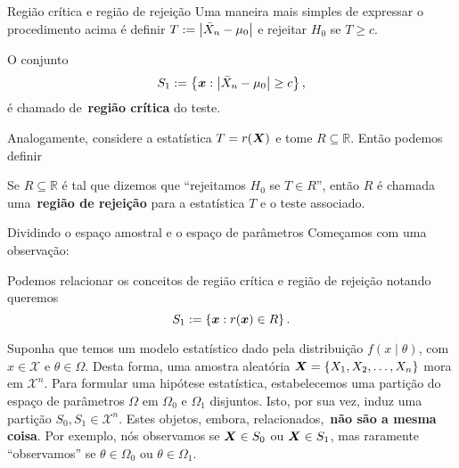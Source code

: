 \begin{frame}{Região crítica e região de rejeição}
 Uma maneira mais simples de expressar o procedimento acima é definir $T := \left|\bar{X}_n - \mu_0\right|$ e rejeitar $H_0$ se $T \geq c$.
 \begin{defn}
  O conjunto 
   \[ S_1 := \left\{ \boldsymbol{x}:  \left|\bar{X}_n - \mu_0\right| \geq c \right\}, \]
   é chamado de~\textbf{região crítica} do teste.
 \end{defn}
 
Analogamente, considere a estatística $T = r(\boldsymbol{X})$ e tome $R \subseteq \mathbb{R}$. 
Então podemos definir
\begin{defn}
Se $R \subseteq \mathbb{R}$ é tal que dizemos que ``rejeitamos $H_0$ se $T \in R$'', então $R$ é chamada uma~\textbf{região de rejeição} para a estatística $T$ e o teste associado.
\end{defn}
\end{frame}

\begin{frame}{Dividindo o espaço amostral e o espaço de parâmetros}
 Começamos com uma observação:
 \begin{obs}
 Podemos relacionar os conceitos de região crítica e região de rejeição notando queremos
   \[ S_1 := \left\{ \boldsymbol{x}:  r(\boldsymbol{x}) \in R \right\}. \]
\end{obs}

\begin{ideia}
 Suponha que temos um modelo estatístico dado pela distribuição $f(x\mid\theta)$, com $x \in \mathcal{X}$ e $\theta \in \Omega$.
 Desta forma, uma amostra aleatória $\boldsymbol{X} = \{ X_1, X_2, \ldots, X_n\}$ mora em $\mathcal{X}^n$.
 Para formular uma hipótese estatística, estabelecemos uma partição do espaço de parâmetros $\Omega$ em $\Omega_0$ e $\Omega_1$ disjuntos.
 Isto, por sua vez, induz uma partição $S_0, S_1 \in \mathcal{X}^n$.
 Estes objetos, embora, relacionados,~\textbf{não são a mesma coisa}.
 Por exemplo, nós observamos se $\boldsymbol{X} \in S_0$ ou $\boldsymbol{X} \in S_1$, mas raramente ``observamos'' se $\theta \in \Omega_0$ ou $\theta \in \Omega_1$.
\end{ideia}
\end{frame}

%  
% 
%  

